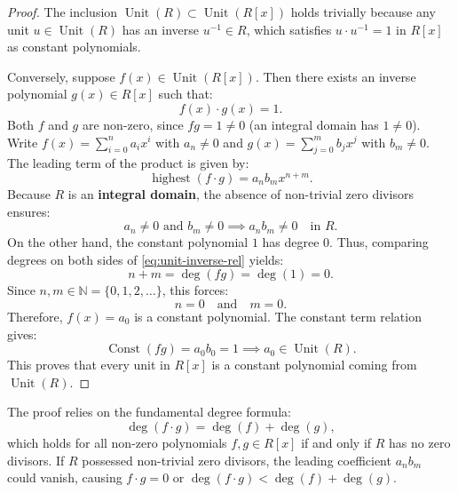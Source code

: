 \begin{content}

\begin{proof}
The inclusion $\operatorname{Unit}(R) \subset \operatorname{Unit}(R[x])$ holds trivially because any unit $u \in \operatorname{Unit}(R)$ has an inverse $u^{-1} \in R$, which satisfies $u \cdot u^{-1} = 1$ in $R[x]$ as constant polynomials.

Conversely, suppose $f(x) \in \operatorname{Unit}(R[x])$. Then there exists an inverse polynomial $g(x) \in R[x]$ such that:
\begin{equation}\label{eq:unit-inverse-rel}
f(x) \cdot g(x) = 1.
\end{equation}
Both $f$ and $g$ are non-zero, since $f g = 1 \neq 0$ (an integral domain has $1 \neq 0$). Write $f(x) = \sum_{i=0}^n a_i x^i$ with $a_n \neq 0$ and $g(x) = \sum_{j=0}^m b_j x^j$ with $b_m \neq 0$.
The leading term of the product is given by:
\[
\operatorname{highest}(f \cdot g) = a_n b_m x^{n+m}.
\]
Because $R$ is an \textbf{integral domain}, the absence of non-trivial zero divisors ensures:
\[
a_n \neq 0 \text{ and } b_m \neq 0 \implies a_n b_m \neq 0 \quad \text{in } R.
\]
On the other hand, the constant polynomial $1$ has degree $0$. Thus, comparing degrees on both sides of \eqref{eq:unit-inverse-rel} yields:
\[
n + m = \deg(fg) = \deg(1) = 0.
\]
Since $n, m \in \mathbb{N} = \{0, 1, 2, \dots\}$, this forces:
\[
n = 0 \quad \text{and} \quad m = 0.
\]
Therefore, $f(x) = a_0$ is a constant polynomial. The constant term relation gives:
\[
\operatorname{Const}(fg) = a_0 b_0 = 1 \implies a_0 \in \operatorname{Unit}(R).
\]
This proves that every unit in $R[x]$ is a constant polynomial coming from $\operatorname{Unit}(R)$.
\end{proof}

\begin{steps}
The proof relies on the fundamental degree formula:
\[
\deg(f \cdot g) = \deg(f) + \deg(g),
\]
which holds for all non-zero polynomials $f, g \in R[x]$ if and only if $R$ has no zero divisors. If $R$ possessed non-trivial zero divisors, the leading coefficient $a_n b_m$ could vanish, causing $f \cdot g = 0$ or $\deg(f \cdot g) < \deg(f) + \deg(g)$.
\end{steps}
\end{content}

